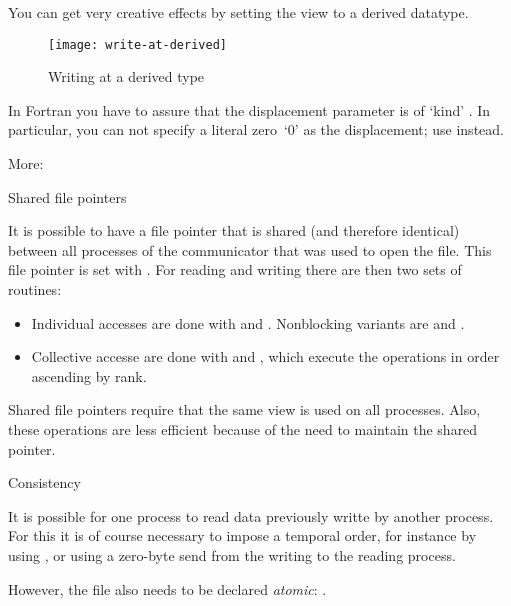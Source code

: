 You can get very creative effects by setting the view to a derived
datatype.

\begin{figure}[ht]
  \label{fig:write-derived}
  \caption{Writing at a derived type}
  \texttt{[image: write-at-derived]}
\end{figure}

\begin{fortrannote}
  In Fortran you have to assure that the displacement parameter is of
  `kind' . In particular, you can not
  specify a literal zero~`0' as the displacement; use
   instead.
\end{fortrannote}

More:

 {Shared file pointers}

It is possible to have a file pointer that is shared (and therefore identical)
between all processes of the communicator that was used to open the file.
This file pointer is set with .
For reading and writing there are then two sets of routines:
\begin{itemize}
\item Individual accesses are done with 
  and .
  Nonblocking variants are 
  and .
\item Collective accesse are done with 
  and , which execute the operations
  in order ascending by rank.
\end{itemize}

Shared file pointers require that the same view is used on all processes.
Also, these operations are less efficient because of the need to maintain the
shared pointer.

 {Consistency}

It is possible for one process to read data previously writte by another process.
For this it is of course necessary to impose a temporal order,
for instance by using ,
or using a zero-byte send from the writing to the reading process.

However, the file also needs to be declared
\emph{atomic}:
.

